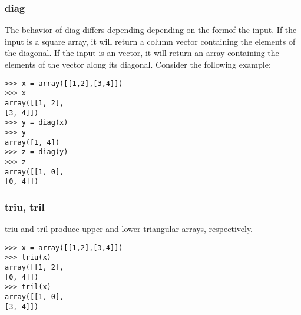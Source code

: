 \documentclass[KSmain.tex]{subfiles}
\begin{document}
\subsubsection{diag}
The behavior of diag differs depending depending on the formof the input. If the input is a square array, it
will return a column vector containing the elements of the diagonal. If the input is an vector, it will return
an array containing the elements of the vector along its diagonal. Consider the following example:
\begin{framed}
\begin{verbatim}
>>> x = array([[1,2],[3,4]])
>>> x
array([[1, 2],
[3, 4]])
>>> y = diag(x)
>>> y
array([1, 4])
>>> z = diag(y)
>>> z
array([[1, 0],
[0, 4]])
\end{verbatim}
\end{framed}
\subsubsection{triu, tril}
triu and tril produce upper and lower triangular arrays, respectively.
\begin{framed}
\begin{verbatim}
>>> x = array([[1,2],[3,4]])
>>> triu(x)
array([[1, 2],
[0, 4]])
>>> tril(x)
array([[1, 0],
[3, 4]])

\end{verbatim}
\end{framed}
\end{document}
